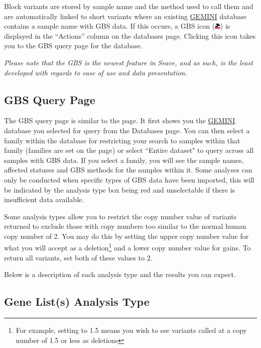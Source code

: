 \documentclass[11pt, a4paper]{article}
\newcommand{\GEMINI}{\href{https://gemini.readthedocs.io}{GEMINI} } %
\begin{document}
Block variants are stored by sample name and the method used to call them and are automatically linked to short variants where an existing \GEMINI database contains a sample name with GBS data. If this occurs, a GBS icon (\includegraphics[width=8pt]{GBS-Icon.png}) is displayed in the ``Actions'' column on the databases page. Clicking this icon takes you to the GBS query page for the database.

\textit{Please note that the GBS is the newest feature in Seave, and as such, is the least developed with regards to ease of use and data presentation.}

\subsection{GBS Query Page}

The GBS query page is similar to the  page. It first shows you the \GEMINI database you selected for query from the Databases page. You can then select a family within the database for restricting your search to samples within that family (families are set on the  page) or select ``Entire dataset" to query across all samples with GBS data. If you select a family, you will see the sample names, affected statuses and GBS methods for the samples within it. Some analyses can only be conducted when specific types of GBS data have been imported, this will be indicated by the analysis type box being red and unselectable if there is insufficient data available.

Some analysis types allow you to restrict the copy number value of variants returned to exclude those with copy numbers too similar to the normal human copy number of 2. You may do this by setting the upper copy number value for what you will accept as a deletion\footnote{For example, setting to 1.5 means you wish to see variants called at a copy number of 1.5 or less as deletions} and a lower copy number value for gains. To return all variants, set both of these values to 2.

Below is a description of each analysis type and the results you can expect.

\subsection{Gene List(s) Analysis Type}
\end{document}
